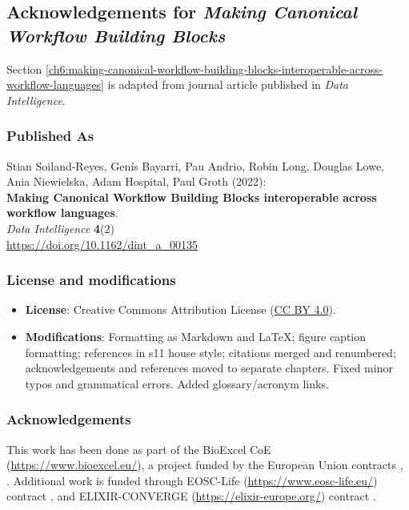 
\subsection{Acknowledgements for \emph{Making Canonical Workflow Building Blocks}}\label{ch11:canonical}

Section \vref{ch6:making-canonical-workflow-building-blocks-interoperable-across-workflow-languages} is adapted from journal article published in \emph{Data Intelligence}.

\subsubsection*{Published As}

Stian Soiland-Reyes, Genís Bayarri, Pau Andrio, Robin Long, Douglas
Lowe, Ania Niewielska, Adam Hospital, Paul Groth (2022):\\
\textbf{Making Canonical Workflow Building Blocks interoperable across
workflow languages}.\\
\emph{Data Intelligence} \textbf{4}(2)\\
\url{https://doi.org/10.1162/dint_a_00135}


\subsubsection*{License and modifications}

\begin{itemize}
\tightlist
\item
  \textbf{License}: Creative Commons Attribution License
  (\href{https://spdx.org/licenses/CC-BY-4.0}{CC BY 4.0}).
\item
  \textbf{Modifications}: Formatting as Markdown and LaTeX; figure caption
  formatting; references in s11 house style; citations merged and renumbered; 
  acknowledgements and references moved to separate chapters. 
  Fixed minor typos and grammatical errors. Added glossary/acronym links.
\end{itemize}



\subsubsection*{Acknowledgements}

This work has been done as part of the BioExcel CoE
(\url{https://www.bioexcel.eu/}), a project funded by the European Union
contracts
,
. Additional work is funded through EOSC-Life
(\url{https://www.eosc-life.eu/}) contract
, and ELIXIR-CONVERGE (\url{https://elixir-europe.org/}) contract
.

